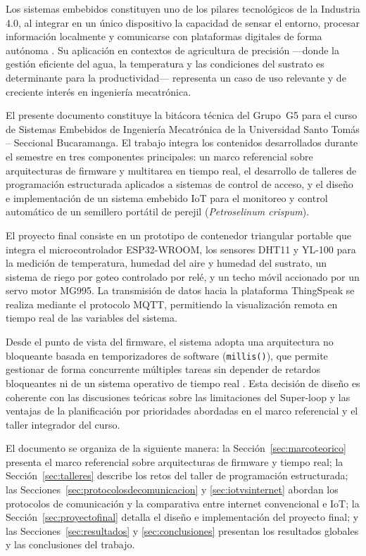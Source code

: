 \setlength{\parskip}{6pt}
\setlength{\parindent}{15pt}

Los sistemas embebidos constituyen uno de los pilares tecnológicos de la Industria 4.0, al integrar en un único dispositivo la capacidad de sensar el entorno, procesar información localmente y comunicarse con plataformas digitales de forma autónoma \cite{sergio_2015_interrupciones}. Su aplicación en contextos de agricultura de precisión —donde la gestión eficiente del agua, la temperatura y las condiciones del sustrato es determinante para la productividad— representa un caso de uso relevante y de creciente interés en ingeniería mecatrónica.

El presente documento constituye la bitácora técnica del Grupo~G5 para el curso de Sistemas Embebidos de Ingeniería Mecatrónica de la Universidad Santo Tomás – Seccional Bucaramanga. El trabajo integra los contenidos desarrollados durante el semestre en tres componentes principales: un marco referencial sobre arquitecturas de firmware y multitarea en tiempo real, el desarrollo de talleres de programación estructurada aplicados a sistemas de control de acceso, y el diseño e implementación de un sistema embebido IoT para el monitoreo y control automático de un semillero portátil de perejil (\textit{Petroselinum crispum}).

El proyecto final consiste en un prototipo de contenedor triangular portable que integra el microcontrolador ESP32-WROOM, los sensores DHT11 y YL-100 para la medición de temperatura, humedad del aire y humedad del sustrato, un sistema de riego por goteo controlado por relé, y un techo móvil accionado por un servo motor MG995. La transmisión de datos hacia la plataforma ThingSpeak se realiza mediante el protocolo MQTT, permitiendo la visualización remota en tiempo real de las variables del sistema.

Desde el punto de vista del firmware, el sistema adopta una arquitectura no bloqueante basada en temporizadores de software (\texttt{millis()}), que permite gestionar de forma concurrente múltiples tareas sin depender de retardos bloqueantes ni de un sistema operativo de tiempo real \cite{wirth_2022_superloop}. Esta decisión de diseño es coherente con las discusiones teóricas sobre las limitaciones del Super-loop y las ventajas de la planificación por prioridades abordadas en el marco referencial y el taller integrador del curso.

El documento se organiza de la siguiente manera: la Sección~\ref{sec:marcoteorico} presenta el marco referencial sobre arquitecturas de firmware y tiempo real; la Sección~\ref{sec:talleres} describe los retos del taller de programación estructurada; las Secciones~\ref{sec:protocolosdecomunicacion} y \ref{sec:iotvsinternet} abordan los protocolos de comunicación y la comparativa entre internet convencional e IoT; la Sección~\ref{sec:proyectofinal} detalla el diseño e implementación del proyecto final; y las Secciones~\ref{sec:resultados} y \ref{sec:conclusiones} presentan los resultados globales y las conclusiones del trabajo.
